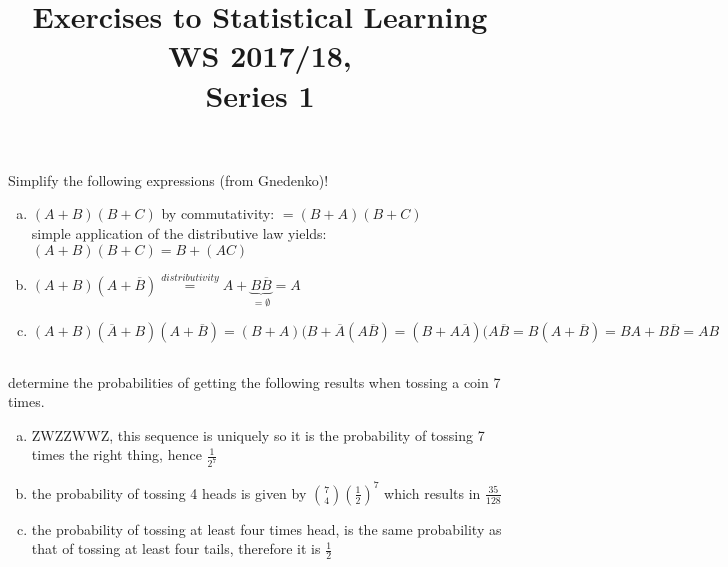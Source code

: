\documentclass[a4paper,10pt]{article}
\title{Exercises to Statistical Learning WS 2017/18,\\
Series 1 }
\author{\MyDetails}
\begin{document}
\maketitle
\setcounter{section}{1}
\subsection{}
\label{sub:one}

Simplify the following expressions (from Gnedenko)!
\begin{enumerate}[(a)]
  \item $(A+B)(B+C)$ by commutativity:   $=(B+A)(B+C)$\\ simple application of the distributive law yields: $(A+B)(B+C)=B+(AC)$
  \item $(A+B)(A+\overline{B}) \stackrel{distributivity}{=}A+ \underbrace{B\overline{B}}_{=\emptyset}=A$
  \item $(A+B)(\overline{A}+B)(A+\overline{B}) = (B+A)(B+\overline{A}(A\overline{B})=(B+A\overline{A})(A \overline{B}= B(A+\overline{B})= BA +B\overline{B}=AB$
\end{enumerate}
\subsection{}
\label{sub:two}
determine the probabilities of getting the following results when tossing a coin 7 times.
\begin{enumerate}[(a)]
  \item ZWZZWWZ, this sequence is uniquely so it is the probability of tossing 7 times the right thing, hence $\frac{1}{2^7}$
  \item the probability of tossing 4 heads is given by $ \binom{7}{4}\left( \frac{1}{2} \right)^7$ which results in $ \frac{35}{128}$
  \item the probability of tossing at least four times head, is the same probability as that of tossing at least four tails, therefore it is $ \frac{1}{2}$
\end{enumerate}
\end{document}
